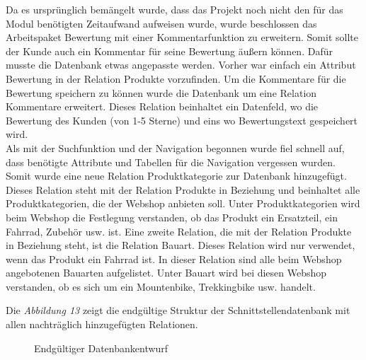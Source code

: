 Da es ursprünglich bemängelt wurde, dass das Projekt noch nicht den für das Modul benötigten Zeitaufwand aufweisen wurde, wurde beschlossen das Arbeitspaket \glqq Bewertung\grqq{} mit einer Kommentarfunktion zu erweitern. Somit sollte der Kunde auch ein Kommentar für seine Bewertung äußern können. Dafür musste die Datenbank etwas angepasste werden. Vorher war einfach ein Attribut \glqq Bewertung\grqq{} in der Relation \glqq Produkte\grqq{} vorzufinden. Um die Kommentare für die Bewertung speichern zu können wurde die Datenbank um eine Relation \glqq Kommentare\grqq{} erweitert. Dieses Relation beinhaltet ein Datenfeld, wo die Bewertung des Kunden (von 1-5 Sterne) und eins wo Bewertungstext gespeichert wird. \\
Als mit der Suchfunktion und der Navigation begonnen wurde fiel schnell auf, dass benötigte Attribute und Tabellen für die Navigation vergessen wurden. Somit wurde eine neue Relation \glqq Produktkategorie\grqq{} zur Datenbank hinzugefügt. Dieses Relation steht mit der Relation \glqq Produkte\grqq{} in Beziehung und beinhaltet alle Produktkategorien, die der Webshop anbieten soll. Unter Produktkategorien wird beim Webshop die Festlegung verstanden, ob das Produkt ein Ersatzteil, ein Fahrrad, Zubehör usw. ist. Eine zweite Relation, die mit der Relation Produkte in Beziehung steht, ist die Relation \glqq Bauart\grqq{}. Dieses Relation wird nur verwendet, wenn das Produkt ein Fahrrad ist. In dieser Relation sind alle beim Webshop angebotenen Bauarten aufgelistet. Unter Bauart wird bei diesen Webshop verstanden, ob es sich um ein Mountenbike, Trekkingbike usw. handelt.

Die \textit{Abbildung 13} zeigt die endgültige Struktur der Schnittstellendatenbank mit allen nachträglich hinzugefügten Relationen. 
\begin{figure}[H]
	\begin{center}
	\end{center}
	\caption{Endgültiger Datenbankentwurf}
\end{figure}


